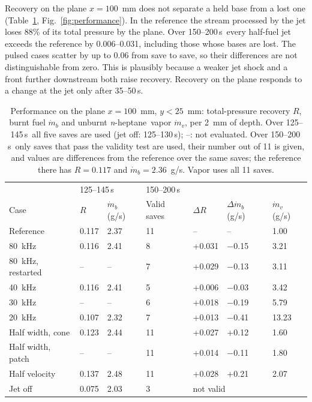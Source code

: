 \documentclass[aip,pof,preprint,amsmath,amssymb]{revtex4-2}
\newcommand{\us}{\,\textmu s}
\newcommand{\nh}{\textit{n}-heptane}
\begin{document}
Recovery on the plane $x = 100$~mm does not separate a held base from a lost one (Table~\ref{tab:performance}, Fig.~\ref{fig:performance}). In the reference the stream processed by the jet loses 88\% of its total pressure by the plane. Over 150--200\us\ every half-fuel jet exceeds the reference by 0.006--0.031, including those whose bases are lost. The pulsed cases scatter by up to 0.06 from save to save, so their differences are not distinguishable from zero. This is plausibly because a weaker jet shock and a front further downstream both raise recovery. Recovery on the plane responds to a change at the jet only after 35--50\us.

\begin{table}
\caption{Performance on the plane $x = 100$~mm, $y < 25$~mm: total-pressure recovery $R$, burnt fuel $\dot m_b$ and unburnt \nh\ vapor $\dot m_v$, per 2~mm of depth. Over 125--145\us\ all five saves are used (jet off: 125--130\us); --: not evaluated. Over 150--200\us\ only saves that pass the validity test are used, their number out of 11 is given, and values are differences from the reference over the same saves; the reference there has $R = 0.117$ and $\dot m_b = 2.36$~g/s. Vapor uses all 11 saves.}\label{tab:performance}
\footnotesize
\begin{tabular}{@{}lllllll@{}}
\toprule
 & \multicolumn{2}{l}{125--145\us} & \multicolumn{4}{l}{150--200\us}\\
Case & $R$ & $\dot m_b$ (g/s) & Valid saves & $\Delta R$ & $\Delta \dot m_b$ (g/s) & $\dot m_v$ (g/s)\\
\midrule
Reference & 0.117 & 2.37 & 11 & -- & -- & 1.00\\
80~kHz & 0.116 & 2.41 & 8 & +0.031 & $-$0.15 & 3.21\\
80~kHz, restarted & -- & -- & 7 & +0.029 & $-$0.13 & 3.11\\
40~kHz & 0.116 & 2.41 & 5 & +0.006 & $-$0.03 & 3.42\\
30~kHz & -- & -- & 6 & +0.018 & $-$0.19 & 5.79\\
20~kHz & 0.107 & 2.32 & 7 & +0.013 & $-$0.41 & 13.23\\
Half width, cone & 0.123 & 2.44 & 11 & +0.027 & +0.12 & 1.60\\
Half width, patch & -- & -- & 11 & +0.014 & $-$0.11 & 1.80\\
Half velocity & 0.137 & 2.48 & 11 & +0.028 & +0.21 & 2.07\\
Jet off & 0.075 & 2.03 & 3 & \multicolumn{3}{l}{not valid}\\
\bottomrule
\end{tabular}
\end{table}
\end{document}
